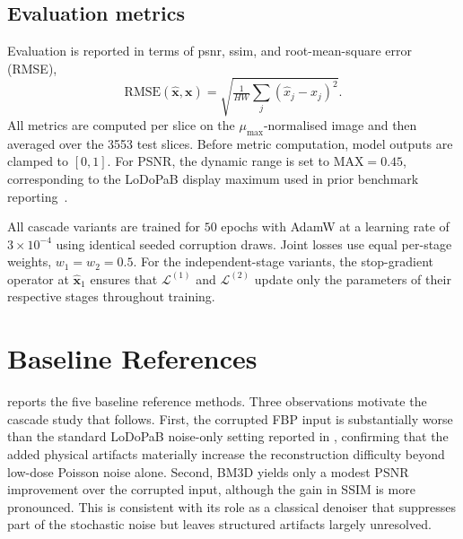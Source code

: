 \subsection{Evaluation metrics}
\label{subsec:exp_metrics}

Evaluation is reported in terms of \gls{psnr}, \gls{ssim}, and root-mean-square error (RMSE),
\begin{equation}
    \mathrm{RMSE}(\hat{\mathbf{x}}, \mathbf{x})
    = \sqrt{\tfrac{1}{HW}\sum_j (\hat{x}_j - x_j)^2}.
    \label{eq:exp_rmse}
\end{equation}
All metrics are computed per slice on the $\mu_{\max}$-normalised image and then averaged over the \num{3553} test slices. Before metric computation, model outputs are clamped to $[0,1]$. For PSNR, the dynamic range is set to $\mathrm{MAX}=0.45$, corresponding to the LoDoPaB display maximum used in prior benchmark reporting~\cite{Leuschner2021, Kiss2024}.

All cascade variants are trained for $50$ epochs with AdamW at a learning rate of $3\times 10^{-4}$ using identical seeded corruption draws. Joint losses use equal per-stage weights, $w_1 = w_2 = 0.5$. For the independent-stage variants, the stop-gradient operator at $\hat{\mathbf{x}}_1$ ensures that $\mathcal{L}^{(1)}$ and $\mathcal{L}^{(2)}$ update only the parameters of their respective stages throughout training.
\section{Baseline References}
\label{sec:exp_baselines_table}

 reports the five baseline reference methods.
Three observations motivate the cascade study that follows. First, the corrupted FBP input is substantially worse than the standard LoDoPaB noise-only setting reported in \cite{Leuschner2021}, confirming that the added physical artifacts materially increase the reconstruction difficulty beyond low-dose Poisson noise alone. Second, BM3D yields only a modest PSNR improvement over the corrupted input, although the gain in SSIM is more pronounced. This is consistent with its role as a classical denoiser that suppresses part of the stochastic noise but leaves structured artifacts largely unresolved.


